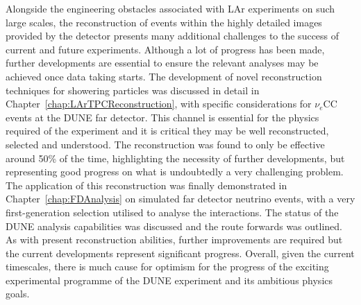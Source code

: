 Alongside the engineering obstacles associated with LAr experiments on such large scales, the reconstruction of events within the highly detailed images provided by the detector presents many additional challenges to the success of current and future experiments.  Although a lot of progress has been made, further developments are essential to ensure the relevant analyses may be achieved once data taking starts.  The development of novel reconstruction techniques for showering particles was discussed in detail in Chapter~\ref{chap:LArTPCReconstruction}, with specific considerations for $\nu_e$CC events at the DUNE far detector.  This channel is essential for the physics required of the experiment and it is critical they may be well reconstructed, selected and understood.  The reconstruction was found to only be effective around 50\% of the time, highlighting the necessity of further developments, but representing good progress on what is undoubtedly a very challenging problem.  The application of this reconstruction was finally demonstrated in Chapter~\ref{chap:FDAnalysis} on simulated far detector neutrino events, with a very first-generation selection utilised to analyse the interactions.  The status of the DUNE analysis capabilities was discussed and the route forwards was outlined.  As with present reconstruction abilities, further improvements are required but the current developments represent significant progress.  Overall, given the current timescales, there is much cause for optimism for the progress of the exciting experimental programme of the DUNE experiment and its ambitious physics goals.
